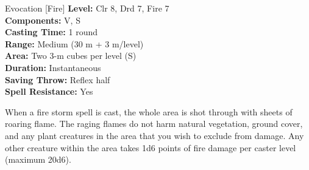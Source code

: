 {Evocation [Fire]}
{
	\textbf{Level:}
	Clr 8, Drd 7, Fire 7\\
	\textbf{Components:}
	V, S\\
	\textbf{Casting Time:}
	1 round\\
	\textbf{Range:}
	Medium (30 m + 3 m/level)\\
	\textbf{Area:}
	Two 3-m cubes per level (S)\\
	\textbf{Duration:}
	Instantaneous\\
	\textbf{Saving Throw:}
	Reflex half\\
	\textbf{Spell Resistance:}
	Yes\\
}
{
	When a fire storm spell is cast, the whole area is shot through with sheets of roaring flame. The raging flames do not harm natural vegetation, ground cover, and any plant creatures in the area that you wish to exclude from damage. Any other creature within the area takes 1d6 points of fire damage per caster level (maximum 20d6).

}
